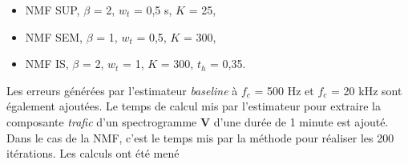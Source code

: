 \begin{itemize}
\item NMF SUP, $\beta$ = 2, $w_t$ = 0,5 s, $K$ = 25,
\item NMF SEM, $\beta$ = 1, $w_t$ = 0,5, $K$ = 300,
\item NMF IS, $\beta$ = 2, $w_t$ = 1, $K$ = 300, $t_h$ = 0,35.
\end{itemize}

Les erreurs générées par l'estimateur \textit{baseline} à $f_c$ = 500 Hz et $f_c$ = 20 kHz sont également ajoutées. Le temps de calcul mis par l'estimateur pour extraire la composante \textit{trafic} d'un spectrogramme $\mathbf{V}$ d'une durée de 1 minute est ajouté. Dans le cas de la NMF, c'est le temps mis par la méthode pour réaliser les 200 itérations. Les calculs ont été mené 

\begin{table}[h]
\centering
\caption{Erreurs $MAE_{60}$ les plus faibles selon les estimateurs NMF pour chaque méthode dans sa combinaison optimale de modalités avec les estimateurs \textit{baseline} à 500 Hz et 20 kHz. En gras-rouge, les erreurs globales les plus faibles, en gras-noir, les erreurs de la NMF inférieures à l'estimateur \textit{baseline} $f_c$ = 500 Hz.}
\label{tab:erreur_mae60_amb}
\end{table}

